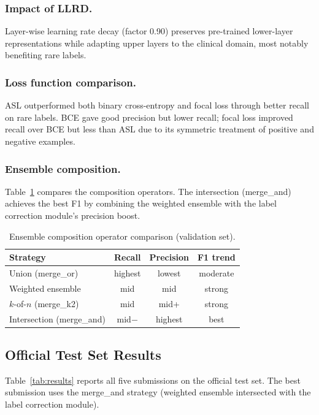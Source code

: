 \subsubsection{Impact of LLRD.}
Layer-wise learning rate decay (factor 0.90) preserves pre-trained lower-layer
representations while adapting upper layers to the clinical domain, most notably
benefiting rare labels.

\subsubsection{Loss function comparison.}
ASL outperformed both binary cross-entropy and focal loss through better recall on rare
labels. BCE gave good precision but lower recall; focal loss improved recall over BCE
but less than ASL due to its symmetric treatment of positive and negative examples.

\subsubsection{Ensemble composition.}
Table~\ref{tab:comp} compares the composition operators. The intersection (merge\_and)
achieves the best F1 by combining the weighted ensemble with the label correction
module's precision boost.

\begin{table}[h]
\centering
\caption{Ensemble composition operator comparison (validation set).}
\label{tab:comp}
\begin{tabular}{lccc}
\toprule
Strategy & Recall & Precision & F1 trend \\
\midrule
Union (merge\_or)         & highest & lowest  & moderate \\
Weighted ensemble         & mid     & mid     & strong \\
$k$-of-$n$ (merge\_k2)   & mid     & mid+    & strong \\
Intersection (merge\_and) & mid$-$  & highest & best \\
\bottomrule
\end{tabular}
\end{table}

\subsection{Official Test Set Results}

Table~\ref{tab:results} reports all five submissions on the official test set. The best
submission uses the merge\_and strategy (weighted ensemble intersected with the label
correction module).

